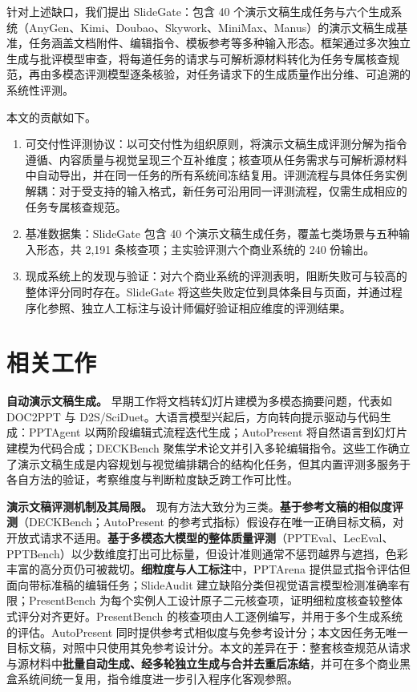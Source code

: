 针对上述缺口，我们提出 SlideGate：包含 40 个演示文稿生成任务与六个生成系统（AnyGen、Kimi、Doubao、Skywork、MiniMax、Manus）的演示文稿生成基准，任务涵盖文档附件、编辑指令、模板参考等多种输入形态。框架通过多次独立生成与批评模型审查，将每道任务的请求与可解析源材料转化为任务专属核查规范，再由多模态评测模型逐条核验，对任务请求下的生成质量作出分维、可追溯的系统性评测。

本文的贡献如下。

\begin{enumerate}
\def\labelenumi{\arabic{enumi}.}
\item
  可交付性评测协议：以可交付性为组织原则，将演示文稿生成评测分解为指令遵循、内容质量与视觉呈现三个互补维度；核查项从任务需求与可解析源材料中自动导出，并在同一任务的所有系统间冻结复用。评测流程与具体任务实例解耦：对于受支持的输入格式，新任务可沿用同一评测流程，仅需生成相应的任务专属核查规范。
\item
  基准数据集：SlideGate 包含 40 个演示文稿生成任务，覆盖七类场景与五种输入形态，共 2,191 条核查项；主实验评测六个商业系统的 240 份输出。
\item
  现成系统上的发现与验证：对六个商业系统的评测表明，阻断失败可与较高的整体评分同时存在。SlideGate 将这些失败定位到具体条目与页面，并通过程序化参照、独立人工标注与设计师偏好验证相应维度的评测结果。
\end{enumerate}

\section{相关工作}\label{ux76f8ux5173ux5de5ux4f5c}

\textbf{自动演示文稿生成。} 早期工作将文档转幻灯片建模为多模态摘要问题，代表如 DOC2PPT 与 D2S/SciDuet。大语言模型兴起后，方向转向提示驱动与代码生成：PPTAgent 以两阶段编辑式流程迭代生成；AutoPresent 将自然语言到幻灯片建模为代码合成；DECKBench 聚焦学术论文并引入多轮编辑指令。这些工作确立了演示文稿生成是内容规划与视觉编排耦合的结构化任务，但其内置评测多服务于各自方法的验证，考察维度与判断粒度缺乏跨工作可比性。

\textbf{演示文稿评测机制及其局限。} 现有方法大致分为三类。\textbf{基于参考文稿的相似度评测}（DECKBench；AutoPresent 的参考式指标）假设存在唯一正确目标文稿，对开放式请求不适用。\textbf{基于多模态大模型的整体质量评测}（PPTEval、LecEval、PPTBench）以少数维度打出可比标量，但设计准则通常不惩罚越界与遮挡，色彩丰富的高分页仍可被裁切。\textbf{细粒度与人工标注}中，PPTArena 提供显式指令评估但面向带标准稿的编辑任务；SlideAudit 建立缺陷分类但视觉语言模型检测准确率有限；PresentBench 为每个实例人工设计原子二元核查项，证明细粒度核查较整体式评分对齐更好。PresentBench 的核查项由人工逐例编写，并用于多个生成系统的评估。AutoPresent 同时提供参考式相似度与免参考设计分；本文因任务无唯一目标文稿，对照中只使用其免参考设计分。本文的差异在于：整套核查规范从请求与源材料中\textbf{批量自动生成、经多轮独立生成与合并去重后冻结}，并可在多个商业黑盒系统间统一复用，指令维度进一步引入程序化客观参照。

